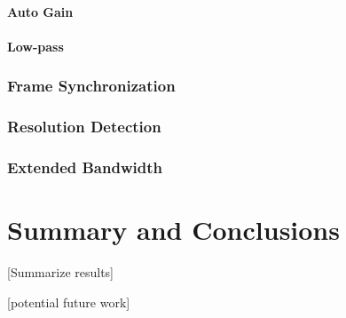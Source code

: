 \documentclass[a4paper,12pt,twoside,openright]{report}
\begin{document}
\subsubsection{Auto Gain}

\subsubsection{Low-pass}

\subsection{Frame Synchronization}

\subsection{Resolution Detection}

\subsection{Extended Bandwidth}


\chapter{Summary and Conclusions} 

[Summarize results]

[potential future work]

\appendix
\singlespacing

 
 
\end{document}

